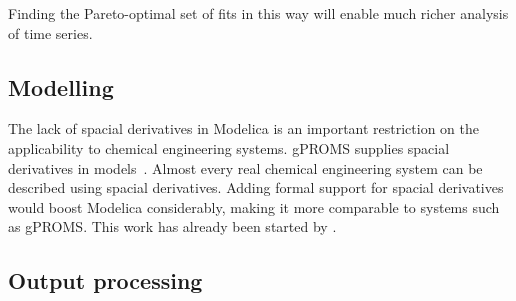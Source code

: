 Finding the Pareto-optimal set of fits in this way will enable much richer analysis of time series.

\subsection{Modelling}
The lack of spacial derivatives in Modelica is an important restriction on the applicability to chemical engineering systems.  
gPROMS supplies spacial derivatives in models~\citep[861]{tiller.ph-d-2001introduction}.
Almost every real chemical engineering system can be described using spacial derivatives.
Adding formal support for spacial derivatives would boost Modelica considerably, making it more comparable to systems such as gPROMS.
This work has already been started by \citet{saldamli_pdemodelica_2006}.

\subsection{Output processing}

